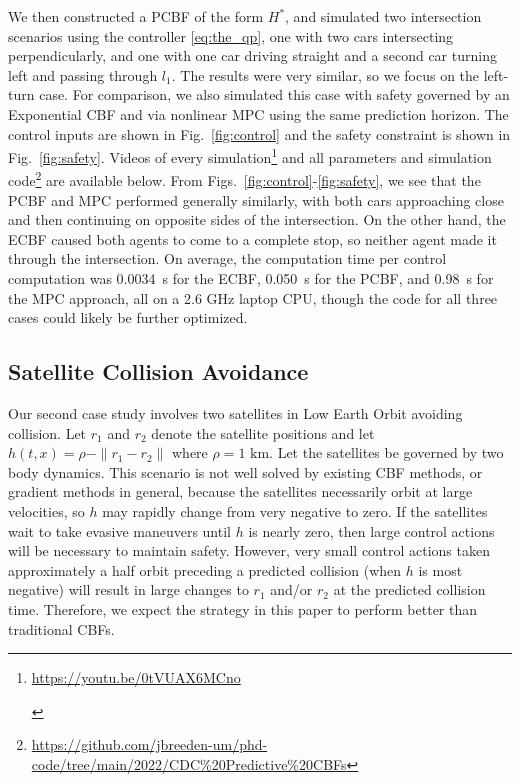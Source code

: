 \documentclass[10pt,conference]{ieeeconf}
\makeatletter
\newcommand\footnoteref[1]{\protected@xdef\@thefnmark{\ref{#1}}\@footnotemark}
\renewcommand{\(}{\left(}
\renewcommand{\)}{\right)}
\renewcommand{\[}{\left[}
\renewcommand{\]}{\right]}
\newcommand{\extendedversion}[1]{{\color{black}#1}}
\makeatother
\begin{document}
We then constructed a PCBF of the form $H^*$, and simulated two intersection scenarios using the controller \eqref{eq:the_qp}, one with two cars intersecting perpendicularly, and one with one car driving straight and a second car turning left {and passing through $l_1$}. The results were very similar, so we focus on the left-turn case. For comparison, we also simulated this case with safety governed by an Exponential CBF \cite{Exponential_CBF} and via nonlinear MPC using the same prediction horizon. The control inputs are shown in Fig.~\ref{fig:control} and the safety constraint is shown in Fig.~\ref{fig:safety}. Videos of every simulation\footnote{\hypertarget{note:car}{\url{https://youtu.be/0tVUAX6MCno}}} and all parameters and simulation code\footnote{\label{note:code}\url{https://github.com/jbreeden-um/phd-code/tree/main/2022/CDC\%20Predictive\%20CBFs}} are available below. From Figs.~\ref{fig:control}-\ref{fig:safety}, we see that the PCBF and MPC performed generally similarly, with both cars approaching close and then continuing on opposite sides of the intersection. On the other hand, the ECBF caused both agents to come to a complete stop, so neither agent made it through the intersection. On average, the computation time per control computation was 0.0034~s for the ECBF, 0.050~s for the PCBF, and 0.98~s for the MPC approach, {all on a 2.6 GHz laptop CPU, though the code\footnoteref{note:code} for all three cases could likely be further optimized}.

\subsection{Satellite Collision Avoidance} \label{sec:satellite}

Our second case study involves two satellites in Low Earth Orbit avoiding collision.  Let $r_1$ and $r_2$ denote the satellite positions and let $h(t,x) = \rho - \| r_1 - r_2 \|$ where $\rho = 1\textrm{ km}$. Let the satellites be governed by two body dynamics. This scenario is not well solved by existing CBF methods, or gradient methods in general, because the satellites necessarily orbit at large velocities, so $h$ may rapidly change from very negative to zero. If the satellites wait to take evasive maneuvers until $h$ is nearly zero, then large control actions will be necessary to maintain safety. However, very small control actions taken approximately a half orbit preceding a predicted collision (when $h$ is most negative) will result in large changes to $r_1$ and/or $r_2$ at the predicted collision time. Therefore, we expect the strategy in this paper to perform better than traditional CBFs.\extendedversion{\footnotetext[3]{{\hypertarget{note:satellite}{\url{https://youtu.be/HhtWUG63BWY}}}}}
\end{document}
